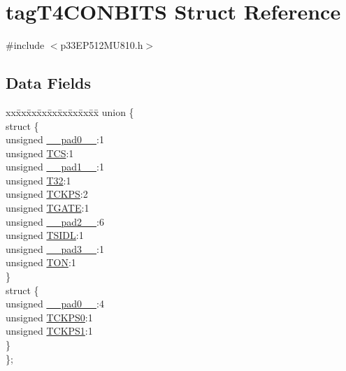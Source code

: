 \hypertarget{structtag_t4_c_o_n_b_i_t_s}{}\section{tag\+T4\+C\+O\+N\+B\+I\+TS Struct Reference}
\label{structtag_t4_c_o_n_b_i_t_s}


{\ttfamily \#include $<$p33\+E\+P512\+M\+U810.\+h$>$}

\subsection*{Data Fields}
\begin{DoxyCompactItemize}
\item 
\begin{tabbing}
xx\=xx\=xx\=xx\=xx\=xx\=xx\=xx\=xx\=\kill
union \{\\
\>struct \{\\
\>\>unsigned \hyperlink{structtag_t4_c_o_n_b_i_t_s_adf71f3d8410c1f1dbbc96680a92c49af}{\_\_pad0\_\_}:1\\
\>\>unsigned \hyperlink{structtag_t4_c_o_n_b_i_t_s_ab4daee3a10870ffba1c86d5020adb9b4}{TCS}:1\\
\>\>unsigned \hyperlink{structtag_t4_c_o_n_b_i_t_s_acaf2d0924a107ec6e8d2e31febaf66f9}{\_\_pad1\_\_}:1\\
\>\>unsigned \hyperlink{structtag_t4_c_o_n_b_i_t_s_a3bb4354090702842f0789980bb1cd45c}{T32}:1\\
\>\>unsigned \hyperlink{structtag_t4_c_o_n_b_i_t_s_a0d455d68434019feaabe9dfb64d75552}{TCKPS}:2\\
\>\>unsigned \hyperlink{structtag_t4_c_o_n_b_i_t_s_a35b6e4b591a8bd20e026168399eb0e6a}{TGATE}:1\\
\>\>unsigned \hyperlink{structtag_t4_c_o_n_b_i_t_s_a4d97cc5f7d51d22fc2bf3eab35c9cb7f}{\_\_pad2\_\_}:6\\
\>\>unsigned \hyperlink{structtag_t4_c_o_n_b_i_t_s_a4971b881615ef42703b5b78179fcda3d}{TSIDL}:1\\
\>\>unsigned \hyperlink{structtag_t4_c_o_n_b_i_t_s_ad7d7cee33e0c7f447abc4d171c628dd4}{\_\_pad3\_\_}:1\\
\>\>unsigned \hyperlink{structtag_t4_c_o_n_b_i_t_s_a8c2a094047d1019ce1c5b25ea8cff9b3}{TON}:1\\
\>\} \\
\>struct \{\\
\>\>unsigned \hyperlink{structtag_t4_c_o_n_b_i_t_s_adf71f3d8410c1f1dbbc96680a92c49af}{\_\_pad0\_\_}:4\\
\>\>unsigned \hyperlink{structtag_t4_c_o_n_b_i_t_s_a5cd4ef74604f5d88289a53f41cf38b7e}{TCKPS0}:1\\
\>\>unsigned \hyperlink{structtag_t4_c_o_n_b_i_t_s_ae190f2375c403c9fe8f5eb62a5bdf200}{TCKPS1}:1\\
\>\} \\
\}; \\

\end{tabbing}\end{DoxyCompactItemize}


